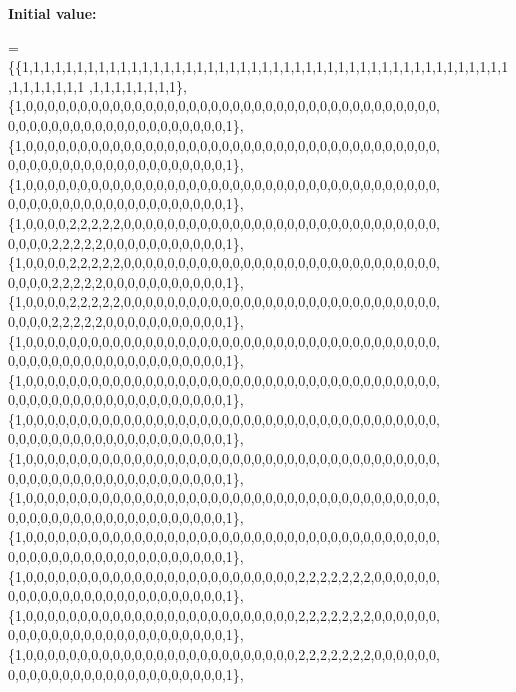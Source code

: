 {\bfseries Initial value\+:}
\begin{DoxyCode}
= \{\{1,1,1,1,1,1,1,1,1,1,1,1,1,1,1,1,1,1,1,1,1,1,1,1,1,1,1,1,1,1,1,1,1,1,1,1,1,1,1,1,1,1,1,1,1,1,1,1,1,1,1,1
      ,1,1,1,1,1,1,1,1\},
                            \{1,0,0,0,0,0,0,0,0,0,0,0,0,0,0,0,0,0,0,0,0,0,0,0,0,0,0,0,0,0,0,0,0,0,0,0,0,0,0,
      0,0,0,0,0,0,0,0,0,0,0,0,0,0,0,0,0,0,0,0,1\},
                            \{1,0,0,0,0,0,0,0,0,0,0,0,0,0,0,0,0,0,0,0,0,0,0,0,0,0,0,0,0,0,0,0,0,0,0,0,0,0,0,
      0,0,0,0,0,0,0,0,0,0,0,0,0,0,0,0,0,0,0,0,1\},
                            \{1,0,0,0,0,0,0,0,0,0,0,0,0,0,0,0,0,0,0,0,0,0,0,0,0,0,0,0,0,0,0,0,0,0,0,0,0,0,0,
      0,0,0,0,0,0,0,0,0,0,0,0,0,0,0,0,0,0,0,0,1\},
                            \{1,0,0,0,0,2,2,2,2,2,0,0,0,0,0,0,0,0,0,0,0,0,0,0,0,0,0,0,0,0,0,0,0,0,0,0,0,0,0,
      0,0,0,0,2,2,2,2,2,0,0,0,0,0,0,0,0,0,0,0,1\},
                            \{1,0,0,0,0,2,2,2,2,2,0,0,0,0,0,0,0,0,0,0,0,0,0,0,0,0,0,0,0,0,0,0,0,0,0,0,0,0,0,
      0,0,0,0,2,2,2,2,2,0,0,0,0,0,0,0,0,0,0,0,1\},
                            \{1,0,0,0,0,2,2,2,2,2,0,0,0,0,0,0,0,0,0,0,0,0,0,0,0,0,0,0,0,0,0,0,0,0,0,0,0,0,0,
      0,0,0,0,2,2,2,2,2,0,0,0,0,0,0,0,0,0,0,0,1\},
                            \{1,0,0,0,0,0,0,0,0,0,0,0,0,0,0,0,0,0,0,0,0,0,0,0,0,0,0,0,0,0,0,0,0,0,0,0,0,0,0,
      0,0,0,0,0,0,0,0,0,0,0,0,0,0,0,0,0,0,0,0,1\},
                            \{1,0,0,0,0,0,0,0,0,0,0,0,0,0,0,0,0,0,0,0,0,0,0,0,0,0,0,0,0,0,0,0,0,0,0,0,0,0,0,
      0,0,0,0,0,0,0,0,0,0,0,0,0,0,0,0,0,0,0,0,1\},
                            \{1,0,0,0,0,0,0,0,0,0,0,0,0,0,0,0,0,0,0,0,0,0,0,0,0,0,0,0,0,0,0,0,0,0,0,0,0,0,0,
      0,0,0,0,0,0,0,0,0,0,0,0,0,0,0,0,0,0,0,0,1\},
                            \{1,0,0,0,0,0,0,0,0,0,0,0,0,0,0,0,0,0,0,0,0,0,0,0,0,0,0,0,0,0,0,0,0,0,0,0,0,0,0,
      0,0,0,0,0,0,0,0,0,0,0,0,0,0,0,0,0,0,0,0,1\},
                            \{1,0,0,0,0,0,0,0,0,0,0,0,0,0,0,0,0,0,0,0,0,0,0,0,0,0,0,0,0,0,0,0,0,0,0,0,0,0,0,
      0,0,0,0,0,0,0,0,0,0,0,0,0,0,0,0,0,0,0,0,1\},
                            \{1,0,0,0,0,0,0,0,0,0,0,0,0,0,0,0,0,0,0,0,0,0,0,0,0,0,0,0,0,0,0,0,0,0,0,0,0,0,0,
      0,0,0,0,0,0,0,0,0,0,0,0,0,0,0,0,0,0,0,0,1\},
                            \{1,0,0,0,0,0,0,0,0,0,0,0,0,0,0,0,0,0,0,0,0,0,0,0,0,0,2,2,2,2,2,2,2,0,0,0,0,0,0,
      0,0,0,0,0,0,0,0,0,0,0,0,0,0,0,0,0,0,0,0,1\},
                            \{1,0,0,0,0,0,0,0,0,0,0,0,0,0,0,0,0,0,0,0,0,0,0,0,0,0,2,2,2,2,2,2,2,0,0,0,0,0,0,
      0,0,0,0,0,0,0,0,0,0,0,0,0,0,0,0,0,0,0,0,1\},
                            \{1,0,0,0,0,0,0,0,0,0,0,0,0,0,0,0,0,0,0,0,0,0,0,0,0,0,2,2,2,2,2,2,2,0,0,0,0,0,0,
      0,0,0,0,0,0,0,0,0,0,0,0,0,0,0,0,0,0,0,0,1\},

\end{DoxyCode}
